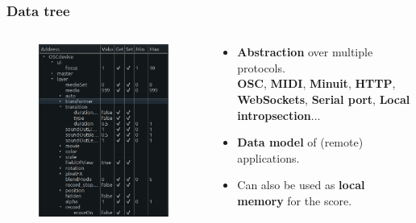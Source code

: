 \documentclass{beamer}
\begin{document}
\begin{frame}
    \frametitle{Data tree}  
    \Large
    
    \begin{columns}
        \begin{column}{0.40\textwidth}
            \begin{figure}
                \includegraphics[width=\textwidth]{images/device.png}
            \end{figure}
        \end{column}
        \begin{column}{0.55\textwidth}
            \begin{itemize}
                \item \textbf{Abstraction} over multiple protocols.~\\{\small \textbf{OSC}, \textbf{MIDI}, \textbf{Minuit}, \textbf{HTTP}, \textbf{WebSockets}, \textbf{Serial port}, \textbf{Local intropsection}}...
                \item \textbf{Data model} of (remote) applications.
                \item Can also be used as \textbf{local memory} for the score.
            \end{itemize}
        \end{column}
    \end{columns}
\end{frame}
\end{document}
